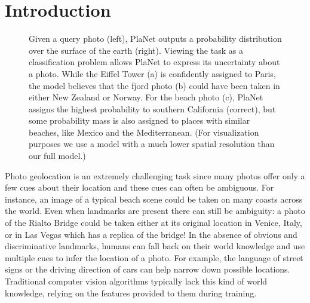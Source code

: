 \documentclass[10pt,twocolumn,letterpaper]{article}
\begin{document}
\section{Introduction}

\begin{figure}[t]
  \centering
  \setlength\tabcolsep{1pt}
   \def \si {.38}
   \def \sm {.55}
  \def \sc {.01}
  
    \vspace{-5pt}
   \vspace{-5pt}
  \caption{Given a query photo (left), PlaNet outputs a
probability distribution over the surface of the earth (right).
Viewing the task as a classification problem allows PlaNet to
express its uncertainty about a photo. While the Eiffel Tower (a) is
confidently assigned to Paris, the model believes that the fjord photo (b)
could have been taken in either New Zealand or Norway. For the beach
photo (c), PlaNet assigns the highest probability to southern
California (correct), but some probability mass is also assigned to
places with similar beaches, like Mexico and the Mediterranean. (For
visualization purposes we use a model with a much lower spatial
resolution than our full model.)}
  \label{fig:uncertainty}
\end{figure}

Photo geolocation is an extremely challenging task since many photos
offer only a few cues about their location and these cues can often be
ambiguous. For instance, an image of a typical beach scene could be
taken on many coasts across the world. Even when landmarks are present
there can still be ambiguity: a photo of the Rialto Bridge could be
taken either at its original location in Venice, Italy, or in Las
Vegas which has a replica of the bridge! In the absence of obvious and
discriminative landmarks, humans can fall back on their world
knowledge and use multiple cues to infer the location of a photo. For
example, the language of street signs or the driving direction of cars
can help narrow down possible locations. Traditional computer vision
algorithms typically lack this kind of world knowledge, relying on the
features provided to them during training.
\end{document}
